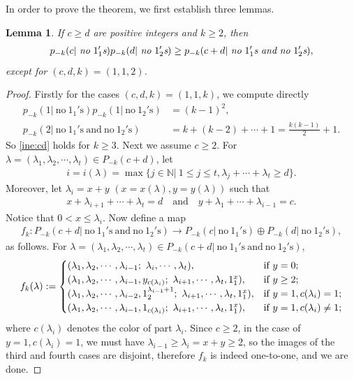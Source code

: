 \documentclass[12pt,reqno]{amsart}
\numberwithin{equation}{section}
\theoremstyle{plain}
\newtheorem{lemma}[theorem]{Lemma}
\theoremstyle{definition}
\begin{document}
In order to prove the theorem, we first establish three lemmas.
\begin{lemma}\label{key lemma}
If $c\ge d$ are positive integers and $k\geq2$, then
\begin{align}\label{ine:cd}
p_{-k}(c|~\emph{no}~1_{1}'\emph{s})p_{-k}(d|~\emph{no}~1_{2}'\emph{s})\geq p_{-k}(c+d|~\emph{no}~1_{1}'\emph{s}~\emph{and}~\emph{no}~1_{2}'\emph{s}),
\end{align}
except for $(c,d,k)=(1,1,2)$.
\end{lemma}
\begin{proof}
Firstly for the cases $(c,d,k)=(1,1,k)$, we compute directly
\begin{align*}
p_{-k}(1|~\text{no}~1_{1}'\text{s})p_{-k}(1|~\text{no}~1_{2}'\text{s})&=(k-1)^2,\\
p_{-k}(2|~\text{no}~1_{1}'\text{s}~\text{and}~\text{no}~1_{2}'\text{s})&=k+(k-2)+\cdots+1=\frac{k(k-1)}{2}+1.
\end{align*}
So \eqref{ine:cd} holds for $k\ge 3$. Next we assume $c\ge 2$.
For $\lambda=(\lambda_{1},\lambda_{2},\cdots,\lambda_{t})\in P_{-k}(c+d)$, let
\begin{align*}
i=i(\lambda)=\max\{j\in\mathbb{N}|~1\leq j\leq t, \lambda_{j}+\cdots+\lambda_{t}\geq d\}.
\end{align*}
Moreover, let $\lambda_{i}=x+y$ $\left(x=x(\lambda),y=y(\lambda)\right)$ such that
\begin{align*}
x+\lambda_{i+1}+\cdots+\lambda_{t}=d\quad \textrm{and}\quad y+\lambda_{1}+\cdots+\lambda_{i-1}=c.
\end{align*}
Notice that $0<x\leq \lambda_{i}$. Now define a map
\begin{align*}
f_{k}: P_{-k}(c+d|~\textrm{no}~1_{1}'\textrm{s}~\textrm{and}~\textrm{no}~1_{2}'\textrm{s})\rightarrow P_{-k}(c|~\textrm{no}~1_1'\textrm{s})\oplus P_{-k}(d|~\textrm{no}~1_{2}'\textrm{s}),
\end{align*}
as follows. For $\lambda=(\lambda_{1},\lambda_{2},\cdots,\lambda_{t})\in P_{-k}(c+d|~\textrm{no}~1_{1}'\textrm{s}~\textrm{and}~\textrm{no}~1_{2}'\textrm{s})$,
\begin{align*}
f_{k}(\lambda):=
\begin{cases}
(\lambda_{1},\lambda_{2},\cdots,\lambda_{i-1};~\lambda_{i},\cdots,\lambda_{t}), &\textrm{if}~y=0; \cr (\lambda_{1},\lambda_{2},\cdots,\lambda_{i-1},y_{c(\lambda_{i})};~
\lambda_{i+1},\cdots,\lambda_{t},1_{1}^{x}), &\textrm{if}~y\geq2; \cr (\lambda_{1},\lambda_{2},\cdots,\lambda_{i-2},1_{2}^{\lambda_{i-1}+1};~\lambda_{i+1},\cdots,
\lambda_{t},1_{1}^{x}), &\textrm{if}~y=1,c(\lambda_i)=1; \cr (\lambda_{1},\lambda_{2},\cdots,\lambda_{i-1},1_{c(\lambda_i)};~\lambda_{i+1},\cdots,\lambda_{t},1_{1}^{x}), &\textrm{if}~y=1,c(\lambda_i)\ne 1;
\end{cases}
\end{align*}
where $c(\lambda_{i})$ denotes the color of part $\lambda_{i}$. Since $c\ge 2$, in the case of $y=1,c(\lambda_i)=1$, we must have $\lambda_{i-1}\ge \lambda_i=x+y\ge 2$, so the images of the third and fourth cases are disjoint, therefore $f_k$ is indeed one-to-one, and we are done.
\end{proof}
\end{document}
